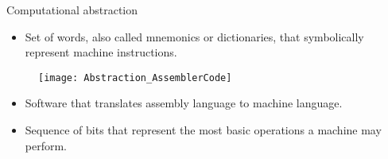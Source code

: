 \begin{frame}{Computational abstraction}
\vspace{-7pt}
  \begin{itemize}
  \item {} Set of words, also called mnemonics or dictionaries, that symbolically represent machine instructions.\pauseprint
  \end{itemize}
  \vspace{-7pt}
  \begin{figure}
    \texttt{[image: Abstraction\_AssemblerCode]}
  \end{figure}
  \vspace{-7pt}
  \pauseprint 
  \begin{itemize}
  \item {} \pauseprint Software that translates assembly language to machine language.\pauseprint
  \item {} \pauseprint Sequence of bits that represent the most basic operations a machine may perform.
  \end{itemize}
\end{frame}


